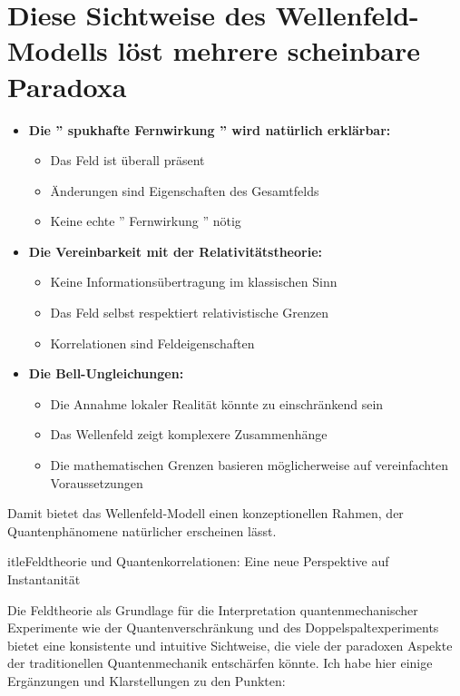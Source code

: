 \documentclass[12pt,a4paper]{article}
\begin{document}
	\section{Diese Sichtweise des Wellenfeld-Modells löst mehrere scheinbare Paradoxa}
	\begin{itemize}
		\item \textbf{Die '' spukhafte Fernwirkung '' wird natürlich erklärbar:}
		\begin{itemize}
			\item Das Feld ist überall präsent
			\item Änderungen sind Eigenschaften des Gesamtfelds
			\item Keine echte '' Fernwirkung '' nötig
		\end{itemize}
		\item \textbf{Die Vereinbarkeit mit der Relativitätstheorie:}
		\begin{itemize}
			\item Keine Informationsübertragung im klassischen Sinn
			\item Das Feld selbst respektiert relativistische Grenzen
			\item Korrelationen sind Feldeigenschaften
		\end{itemize}
		\item \textbf{Die Bell-Ungleichungen:}
		\begin{itemize}
			\item Die Annahme lokaler Realität könnte zu einschränkend sein
			\item Das Wellenfeld zeigt komplexere Zusammenhänge
			\item Die mathematischen Grenzen basieren möglicherweise auf vereinfachten Voraussetzungen
		\end{itemize}
	\end{itemize}
	
	Damit bietet das Wellenfeld-Modell einen konzeptionellen Rahmen, der Quantenphänomene natürlicher erscheinen lässt.
	
	
		itle{Feldtheorie und Quantenkorrelationen: Eine neue Perspektive auf Instantanität}
	
	
	\maketitle
	
	Die Feldtheorie als Grundlage für die Interpretation quantenmechanischer Experimente wie der Quantenverschränkung und des Doppelspaltexperiments bietet eine konsistente und intuitive Sichtweise, die viele der paradoxen Aspekte der traditionellen Quantenmechanik entschärfen könnte. Ich habe hier einige Ergänzungen und Klarstellungen zu den Punkten:
	
\end{document}
